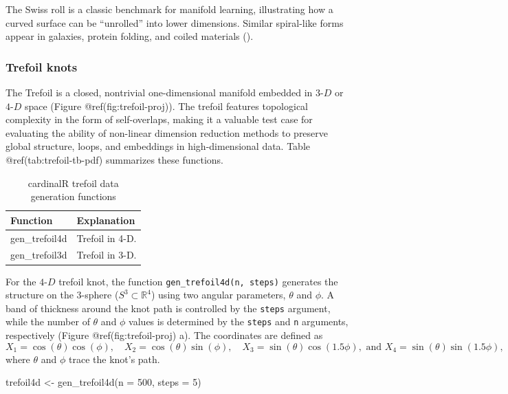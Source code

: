 \documentclass[
  11pt,
  a4paper,
]{report}
\newenvironment{Shaded}{\begin{snugshade}}{\end{snugshade}}
\newcommand{\AttributeTok}[1]{\textcolor[rgb]{0.40,0.45,0.13}{#1}}
\newcommand{\DecValTok}[1]{\textcolor[rgb]{0.68,0.00,0.00}{#1}}
\newcommand{\FunctionTok}[1]{\textcolor[rgb]{0.28,0.35,0.67}{#1}}
\newcommand{\NormalTok}[1]{\textcolor[rgb]{0.00,0.23,0.31}{#1}}
\newcommand{\OtherTok}[1]{\textcolor[rgb]{0.00,0.23,0.31}{#1}}
\begin{document}
The Swiss roll is a classic benchmark for manifold learning,
illustrating how a curved surface can be ``unrolled'' into lower
dimensions. Similar spiral-like forms appear in galaxies, protein
folding, and coiled materials
().

\subsubsection{Trefoil knots}\label{trefoil-knots}

The Trefoil is a closed, nontrivial one-dimensional manifold embedded in
\(3\text{-}D\) or \(4\text{-}D\) space (Figure @ref(fig:trefoil-proj)).
The trefoil features topological complexity in the form of
self-overlaps, making it a valuable test case for evaluating the ability
of non-linear dimension reduction methods to preserve global structure,
loops, and embeddings in high-dimensional data. Table
@ref(tab:trefoil-tb-pdf) summarizes these functions.

\begin{table}

\caption{\label{tab:trefoil-tb-pdf}cardinalR trefoil data generation functions}
\centering
\begin{tabular}[t]{>{\raggedright\arraybackslash}p{4cm}>{\raggedright\arraybackslash}p{8cm}}
\toprule
Function & Explanation\\
\midrule
gen\_trefoil4d & Trefoil in 4-D.\\
gen\_trefoil3d & Trefoil in 3-D.\\
\bottomrule
\end{tabular}
\end{table}

For the \(4\text{-}D\) trefoil knot, the function
\texttt{gen\_trefoil4d(n,\ steps)} generates the structure on the
\(3\)-sphere (\(S^3 \subset \mathbb{R}^4\)) using two angular
parameters, \(\theta\) and \(\phi\). A band of thickness around the knot
path is controlled by the \texttt{steps} argument, while the number of
\(\theta\) and \(\phi\) values is determined by the \texttt{steps} and
\texttt{n} arguments, respectively (Figure @ref(fig:trefoil-proj) a).
The coordinates are defined as
\[X_1 = \cos(\theta) \cos(\phi), \quad X_2 = \cos(\theta) \sin(\phi), \quad X_3 = \sin(\theta) \cos(1.5 \phi),\text{ and }X_4 = \sin(\theta) \sin(1.5 \phi),\]
where \(\theta\) and \(\phi\) trace the knot's path.

\begin{Shaded}
\begin{Highlighting}[]
\NormalTok{trefoil4d }\OtherTok{\textless{}{-}} \FunctionTok{gen\_trefoil4d}\NormalTok{(}\AttributeTok{n =} \DecValTok{500}\NormalTok{, }\AttributeTok{steps =} \DecValTok{5}\NormalTok{)}
\end{Highlighting}
\end{Shaded}
\end{document}
